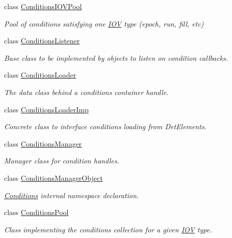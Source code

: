 \begin{DoxyCompactItemize}
class \hyperlink{class_d_d4hep_1_1_conditions_1_1_conditions_i_o_v_pool}{Conditions\+I\+O\+V\+Pool}
\begin{DoxyCompactList}\small\item\em Pool of conditions satisfying one \hyperlink{class_d_d4hep_1_1_i_o_v}{I\+OV} type (epoch, run, fill, etc) \end{DoxyCompactList}\item 
class \hyperlink{class_d_d4hep_1_1_conditions_1_1_conditions_listener}{Conditions\+Listener}
\begin{DoxyCompactList}\small\item\em Base class to be implemented by objects to listen on condition callbacks. \end{DoxyCompactList}\item 
class \hyperlink{class_d_d4hep_1_1_conditions_1_1_conditions_loader}{Conditions\+Loader}
\begin{DoxyCompactList}\small\item\em The data class behind a conditions container handle. \end{DoxyCompactList}\item 
class \hyperlink{class_d_d4hep_1_1_conditions_1_1_conditions_loader_imp}{Conditions\+Loader\+Imp}
\begin{DoxyCompactList}\small\item\em Concrete class to interface conditions loading from Det\+Elements. \end{DoxyCompactList}\item 
class \hyperlink{class_d_d4hep_1_1_conditions_1_1_conditions_manager}{Conditions\+Manager}
\begin{DoxyCompactList}\small\item\em Manager class for condition handles. \end{DoxyCompactList}\item 
class \hyperlink{class_d_d4hep_1_1_conditions_1_1_conditions_manager_object}{Conditions\+Manager\+Object}
\begin{DoxyCompactList}\small\item\em \hyperlink{namespace_d_d4hep_1_1_conditions}{Conditions} internal namespace declaration. \end{DoxyCompactList}\item 
class \hyperlink{class_d_d4hep_1_1_conditions_1_1_conditions_pool}{Conditions\+Pool}
\begin{DoxyCompactList}\small\item\em Class implementing the conditions collection for a given \hyperlink{class_d_d4hep_1_1_i_o_v}{I\+OV} type. \end{DoxyCompactList}\item 

\end{DoxyCompactItemize}
